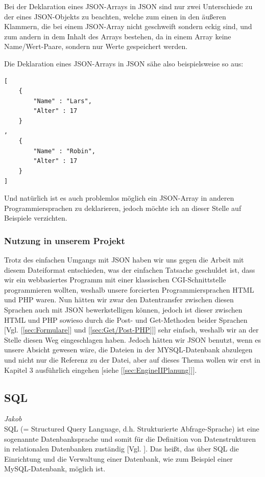 \documentclass[12pt,a4paper,bibliography=totocnumbered,listof=totocnumbered]{scrartcl}
\begin{document}
Bei der Deklaration eines JSON-Arrays in JSON sind nur zwei Unterschiede zu der eines JSON-Objekts zu beachten, welche zum einen in den äußeren Klammern, die bei einem JSON-Array nicht geschweift sondern eckig sind, und zum andern in dem Inhalt des Arrays bestehen, da in einem Array keine Name/Wert-Paare, sondern nur Werte gespeichert werden.

Die Deklaration eines JSON-Arrays in JSON sähe also beispielsweise so aus:
\\
\vspace{1em}
\begin{lstlisting}[caption=Klasse.json, label=lst:json-array]
[
	{
		"Name" : "Lars",
		"Alter" : 17
	}
,
	{
 		"Name" : "Robin",
 		"Alter" : 17
	}
]
\end{lstlisting}

Und natürlich ist es auch problemlos möglich ein JSON-Array in anderen Programmiersprachen zu deklarieren, jedoch möchte ich an dieser Stelle auf Beispiele verzichten.

\subsubsection{Nutzung in unserem Projekt}
Trotz des einfachen Umgangs mit JSON haben wir uns gegen die Arbeit mit diesem Dateiformat entschieden, was der einfachen Tatsache geschuldet ist, dass wir ein webbasiertes Programm mit einer klassischen CGI-Schnittstelle programmieren wollten, weshalb unsere forcierten Programmiersprachen HTML und PHP waren.
Nun hätten wir zwar den Datentransfer zwischen diesen Sprachen auch mit JSON bewerkstelligen können, jedoch ist dieser zwischen HTML und PHP sowieso durch die Post- und Get-Methoden beider Sprachen [Vgl. [\ref{sec:Formulare}] und [\ref{sec:Get/Post-PHP}]] sehr einfach, weshalb wir an der Stelle diesen Weg eingeschlagen haben.
Jedoch hätten wir JSON benutzt, wenn es unsere Absicht gewesen wäre, die Dateien in der MYSQL-Datenbank abzulegen und nicht nur die Referenz zu der Datei, aber auf dieses Thema wollen wir erst in Kapitel 3 ausführlich eingehen [siehe [\ref{sec:EngineIIPlanung}]].

\subsection{SQL}
\label{sec:SQL}
\emph{Jakob}\\
SQL (= Structured Query Language, d.h. Strukturierte Abfrage-Sprache) ist eine sogenannte \glqq Datenbanksprache\grqq{} und somit für die Definition von Datenstrukturen in relationalen Datenbanken zuständig [Vgl. \cite{wiki/SQL}].
Das heißt, das über SQL die Einrichtung und die Verwaltung einer Datenbank, wie zum Beispiel einer MySQL-Datenbank, möglich ist.
\end{document}
